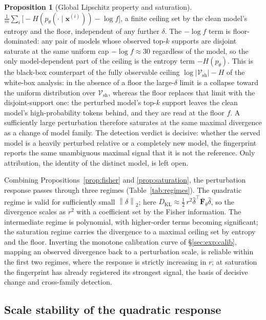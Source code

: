 \documentclass[11pt]{article}
\newcommand{\Vsh}{\mathcal{V}_{\mathrm{sh}}}
\newcommand{\norm}[1]{\left\lVert #1 \right\rVert}
\theoremstyle{definition}
\newtheorem{proposition}{Proposition}
\begin{document}
\begin{proposition}[Global Lipschitz property and saturation]
$\frac1m \sum_i \big[-H(p_\theta(\cdot \mid \bm{x}^{(i)})) - \log f\big]$, a
finite ceiling set by the clean model's entropy and the floor, independent of
any further $\delta$. The $-\log f$ term is floor-dominated: any pair of models
whose observed top-$k$ supports are disjoint saturate at the same uniform cap
$-\log f \approx 30$ regardless of the model, so the only model-dependent part
of the ceiling is the entropy term $-H(p_\theta)$. This is the black-box
counterpart of the fully observable ceiling $\log|\Vsh| - H$ of the white-box
analysis: in the absence of a floor the large-$\delta$ limit is a collapse
toward the uniform distribution over $\Vsh$, whereas the floor replaces that
limit with the disjoint-support one: the perturbed model's top-$k$ support
leaves the clean model's high-probability tokens behind, and they are read at
the floor $f$. A sufficiently large perturbation therefore saturates at the
same maximal divergence as a change of model family. The detection verdict is
decisive: whether the served model is a heavily perturbed relative or a
completely new model, the fingerprint reports the same unambiguous maximal
signal that it is not the reference. Only attribution, the identity of the
distinct model, is left open.
\end{proposition}

Combining Propositions~\ref{prop:fisher} and \ref{prop:saturation}, the
perturbation response passes through three regimes
(Table~\ref{tab:regimes}). The quadratic regime is valid for sufficiently
small $\norm{\delta}_2$; here
$D_{\mathrm{KL}} \approx \tfrac12\, r^2 \hat\delta^\top \bar{\bm{F}}_\theta
\hat\delta$, so the divergence scales as $r^2$ with a coefficient set by the
Fisher information. The intermediate regime is polynomial, with higher-order
terms becoming significant; the saturation regime carries the divergence to a
maximal ceiling set by entropy and the floor. Inverting the monotone
calibration curve of \S\ref{sec:exp:calib}, mapping an observed divergence back
to a perturbation scale, is reliable within the first two regimes, where the
response is strictly increasing in $r$; at saturation the fingerprint has
already registered its strongest signal, the basis of decisive change and
cross-family detection.

\subsection{Scale stability of the quadratic response}
\label{sec:app-scale}
\end{document}
